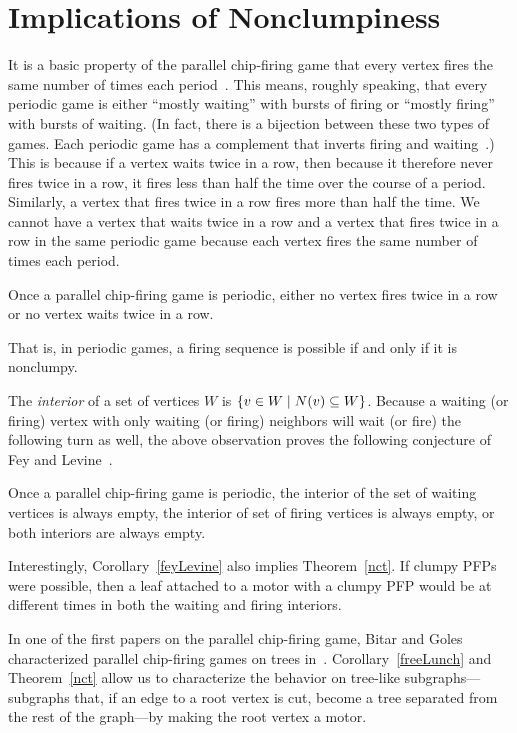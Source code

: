 \section{Implications of Nonclumpiness} \label{corollaries}
It is a basic property of the parallel chip-firing game that every vertex fires
the same number of times each period~\cite{jiang}. This means, roughly
speaking, that every periodic game is either ``mostly waiting'' with bursts of
firing or ``mostly firing'' with bursts of waiting. (In fact, there is a
bijection between these two types of games. Each periodic game has a complement
that inverts firing and waiting~\cite{jiang}.) This is because if a vertex
waits twice in a row, then because it therefore never fires twice in a row, it
fires less than half the time over the course of a period. Similarly, a vertex
that fires twice in a row fires more than half the time. We cannot have a
vertex that waits twice in a row and a vertex that fires twice in a row in the
same periodic game because each vertex fires the same number of times each
period.

\begin{cor}
Once a parallel chip-firing game is periodic, either no vertex fires twice in a
row or no vertex waits twice in a row.
\end{cor}

That is, in periodic games, a firing sequence is possible if and only if it is
nonclumpy.

The \emph{interior} of a set of vertices $W$ is $\set{v \in W}{N(v) \subseteq
  W}$. Because a waiting (or firing) vertex with only waiting (or firing)
neighbors will wait (or fire) the following turn as well, the above observation
proves the following conjecture of Fey and Levine~\cite{privateComms}.

\begin{cor}\label{feyLevine}
Once a parallel chip-firing game is periodic, the interior of the set of
waiting vertices is always empty, the interior of set of firing vertices is
always empty, or both interiors are always empty.
\end{cor}

Interestingly, Corollary~\ref{feyLevine} also implies Theorem~\ref{nct}. If
clumpy PFPs were possible, then a leaf attached to a motor with a clumpy PFP
would be at different times in both the waiting and firing interiors.

In one of the first papers on the parallel chip-firing game, Bitar and Goles
characterized parallel chip-firing games on trees in~\cite{bitarGoles}.
Corollary~\ref{freeLunch} and Theorem~\ref{nct} allow us to characterize the
behavior on tree-like subgraphs---subgraphs that, if an edge to a root vertex
is cut, become a tree separated from the rest of the graph---by making the root
vertex a motor.

